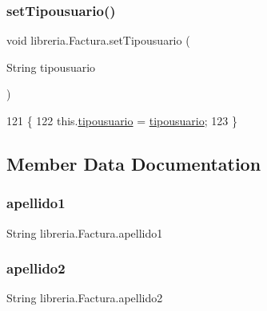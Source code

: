 \subsubsection{\texorpdfstring{set\+Tipousuario()}{setTipousuario()}}
{\footnotesize\ttfamily void libreria.\+Factura.\+set\+Tipousuario (\begin{DoxyParamCaption}\item[{String}]{tipousuario }\end{DoxyParamCaption})\hspace{0.3cm}{\ttfamily [inline]}}


\begin{DoxyCode}
121                                                    \{
122         this.\mbox{\hyperlink{classlibreria_1_1_factura_a79b1b03330788462f7659fc11e6374fc}{tipousuario}} = \mbox{\hyperlink{classlibreria_1_1_factura_a79b1b03330788462f7659fc11e6374fc}{tipousuario}};
123     \}
\end{DoxyCode}


\subsection{Member Data Documentation}
\mbox{\label{classlibreria_1_1_factura_a83e5ee3edddf7c91a71605ea4eeb9d5f}} 
\subsubsection{\texorpdfstring{apellido1}{apellido1}}
{\footnotesize\ttfamily String libreria.\+Factura.\+apellido1\hspace{0.3cm}{\ttfamily [private]}}

\mbox{\label{classlibreria_1_1_factura_af91345af6a4d1ae15efc26bd3ef29524}} 
\subsubsection{\texorpdfstring{apellido2}{apellido2}}
{\footnotesize\ttfamily String libreria.\+Factura.\+apellido2\hspace{0.3cm}{\ttfamily [private]}}

